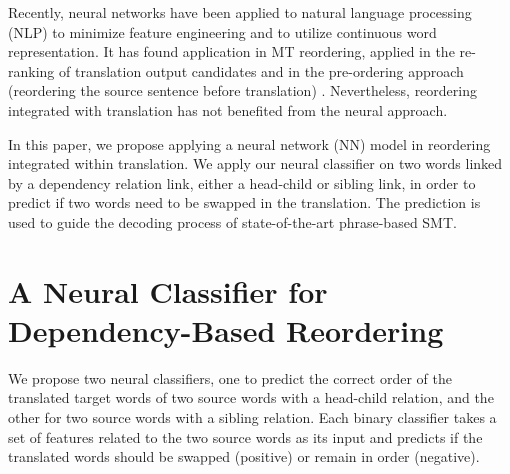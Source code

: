 \documentclass[letterpaper]{article}
\begin{document}
Recently, neural networks have been applied to natural language processing (NLP) to minimize feature engineering and to utilize continuous word representation. It has found application in MT reordering, applied in the re-ranking of translation output candidates \cite{li_neural_2014,cui_lstm_2016} and in the pre-ordering approach (reordering the source sentence before translation) \cite{de_gispert_fast_2015,miceli-barone_non-projective_2015}. Nevertheless, reordering integrated with translation has not benefited from the neural approach.

In this paper, we propose applying a neural network (NN) model in reordering integrated within translation. We apply our neural classifier on two words linked by a dependency relation link, either a head-child or sibling link, in order to predict if two words need to be swapped in the translation. The prediction is used to guide the decoding process of state-of-the-art phrase-based SMT.

\section{A Neural Classifier for Dependency-Based Reordering}

We propose two neural classifiers, one to predict the correct order of the translated target words of two source words with a head-child relation, and the other for two source words with a sibling relation. Each binary classifier takes a set of features related to the two source words as its input and predicts if the translated words should be swapped (positive) or remain in order (negative).
\end{document}
